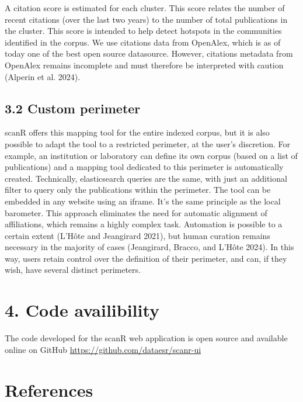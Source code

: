 \documentclass[
]{article}
\begin{document}
A citation score is estimated for each cluster. This score relates the
number of recent citations (over the last two years) to the number of
total publications in the cluster. This score is intended to help detect
hotspots in the communities identified in the corpus. We use citations
data from OpenAlex, which is as of today one of the best open source
datasource. However, citations metadata from OpenAlex remains incomplete
and must therefore be interpreted with caution (Alperin et al. 2024).

\hypertarget{custom-perimeter}{%
\subsection{3.2 Custom perimeter}\label{custom-perimeter}}

scanR offers this mapping tool for the entire indexed corpus, but it is
also possible to adapt the tool to a restricted perimeter, at the user's
discretion. For example, an institution or laboratory can define its own
corpus (based on a list of publications) and a mapping tool dedicated to
this perimeter is automatically created. Technically, elasticsearch
queries are the same, with just an additional filter to query only the
publications within the perimeter. The tool can be embedded in any
website using an iframe. It's the same principle as the local barometer.
This approach eliminates the need for automatic alignment of
affiliations, which remains a highly complex task. Automation is
possible to a certain extent (L'Hôte and Jeangirard 2021), but human
curation remains necessary in the majority of cases (Jeangirard, Bracco,
and L'Hôte 2024). In this way, users retain control over the definition
of their perimeter, and can, if they wish, have several distinct
perimeters.

\hypertarget{code-availibility}{%
\section{4. Code availibility}\label{code-availibility}}

The code developed for the scanR web application is open source and
available online on GitHub \url{https://github.com/dataesr/scanr-ui}

\hypertarget{references}{%
\section*{References}\label{references}}
\end{document}
